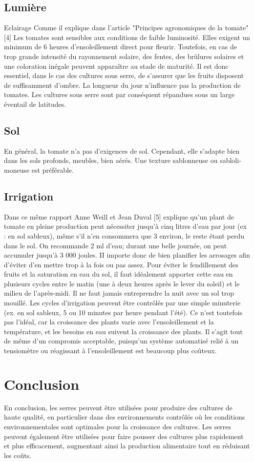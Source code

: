 \subsection{Lumière}
Eclairage
Comme il  explique dans l’article "Principes agronomiques de la tomate" [4]
Les tomates sont sensibles aux conditions de
faible luminosité. Elles exigent un minimum de 6 heures d’ensoleillement direct pour
fleurir. Toutefois, en cas de trop grande intensité du rayonnement solaire, des fentes, des
brûlures solaires et une coloration inégale peuvent apparaître au stade de maturité. Il est
donc essentiel, dans le cas des cultures sous serre, de s’assurer que les fruits disposent de
suffisamment d’ombre. La longueur du jour n’influence pas la production de tomates. Les
cultures sous serre sont par conséquent répandues sous un large éventail de latitudes.
\subsection{Sol}
En général, la tomate n'a pas d'exigences de sol. Cependant, elle s'adapte bien dans les sols profonds, meubles, bien aérés. Une texture sablonneuse ou sabloli-moneuse est préférable.
\subsection{Irrigation}
Dans ce même rapport Anne Weill et Jean Duval [5] explique 
qu'un plant de tomate en pleine production peut nécessiter jusqu'à cinq litres d'eau par jour (ex : en sol sableux), même s'il n'en consommera que 3 environ, le reste étant perdu dans le sol. On recommande 2 ml d'eau; durant une belle journée, on peut accumuler jusqu'à 3 000 joules. II importe donc de bien planifier les arrosages afin d'éviter d'en mettre trop à la fois ou pas assez.
Pour éviter le fendillement des fruits et la saturation en eau du sol, il faut idéalement apporter cette eau en plusieurs cycles entre le matin (une à deux heures après le lever du soleil) et le milieu de l'après-midi. Il ne faut jamais entreprendre la nuit avec un sol trop mouillé. Les cycles d'irrigation peuvent être contrôlés par une simple minuterie (ex. en sol sableux, 5 ou 10 minutes par heure pendant l'été). Ce n'est toutefois pas l'idéal, car la croissance des plants varie avec l'ensoleillement et la température, et les besoins en eau suivent la croissance des plants. Il s'agit tout de même d'un compromis acceptable, puisqu'un système automatisé relié à un tensiomètre ou réagissant à l'ensoleillement est beaucoup plus coûteux.
\section{Conclusion}
En conclusion, les serres peuvent être utilisées pour produire des cultures de haute qualité, en particulier dans des environnements contrôlés où les conditions environnementales sont optimales pour la croissance des cultures. Les serres peuvent également être utilisées pour faire pousser des cultures plus rapidement et plus efficacement, augmentant ainsi la production alimentaire tout en réduisant les coûts. 
